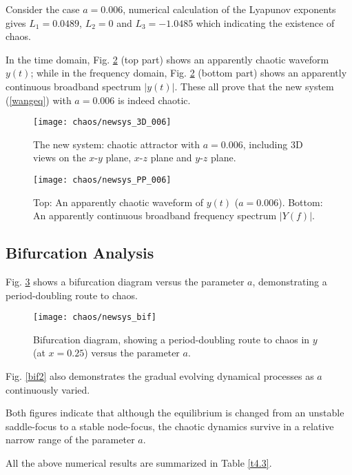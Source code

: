 Consider the case $a=0.006$, numerical calculation of the 
Lyapunov exponents gives $L_1 = 0.0489$, $L_2 =0$ and $L_3
=-1.0485$ which indicating the existence of chaos.

In the time domain, Fig. \ref{006} (top part) shows an apparently
chaotic waveform $y(t)$; while in the frequency domain,
Fig. \ref{006} (bottom part) shows an apparently continuous
broadband spectrum $|y(t)|$. These all prove that the new system
(\ref{wangeq}) with $a=0.006$ is indeed chaotic.

\begin{figure}[h]
\centering
\texttt{[image: chaos/newsys\_3D\_006]}
 \caption{\label{0063D}The new system: chaotic attractor with
$a=0.006$, including 3D views on the $x$-$y$ plane, $x$-$z$ plane
and $y$-$z$ plane.} 
\end{figure}

\bigbreak

\begin{figure}[h]
\centering
\texttt{[image: chaos/newsys\_PP\_006]}
 \caption{\label{006}Top: An apparently chaotic waveform of
$y(t)$ ($a=0.006$). Bottom: An apparently continuous broadband
frequency spectrum $|Y(f)|$.}
\end{figure}

\subsection{Bifurcation Analysis}

Fig. \ref{bif} shows a bifurcation diagram versus the parameter
$a$, demonstrating a period-doubling route to chaos.

\begin{figure}[h]
\centering
\texttt{[image: chaos/newsys\_bif]}
\caption{\label{bif}Bifurcation diagram, showing a
period-doubling route to chaos in $y$ (at $x=0.25$) versus the
parameter $a$.} 
\end{figure}

Fig. \ref{bif2} also demonstrates the gradual evolving dynamical
processes as $a$ continuously varied.

Both figures indicate that although the equilibrium is changed
from an unstable saddle-focus to a stable node-focus, the chaotic
dynamics survive in a relative narrow range of the parameter $a$.

All the above numerical results are summarized in Table \ref{t4.3}.

